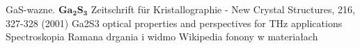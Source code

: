 \newpage
 
\begin{thebibliography}{}
	 GaS-wazne.
	 $\mathbf{Ga_{2}S_{3}}$ Zeitschrift für Kristallographie - New Crystal Structures, 216, 327-328 (2001)
	 Ga2S3 optical properties and perspectives for THz applications
	 Spectroskopia Ramana drgania i widmo
	 Wikipedia fonony w materiałach
\end{thebibliography}